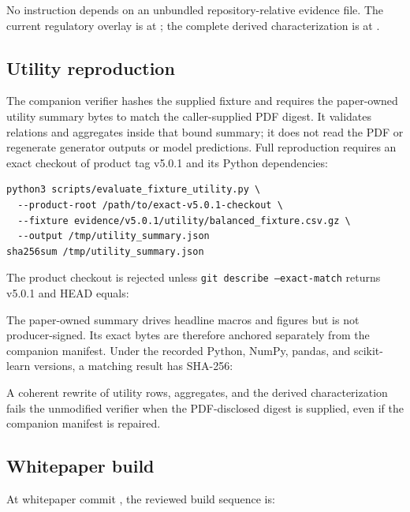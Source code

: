 No instruction depends on an unbundled repository-relative evidence file. The current regulatory
overlay is at
; the complete derived
characterization is at .

\subsection{Utility reproduction}

The companion verifier hashes the supplied fixture and requires the paper-owned utility summary
bytes to match the caller-supplied PDF digest. It validates relations and aggregates inside that
bound summary; it does not read the PDF or regenerate generator outputs or model predictions. Full
reproduction requires an exact checkout of product tag v5.0.1 and its Python dependencies:

\begin{verbatim}
python3 scripts/evaluate_fixture_utility.py \
  --product-root /path/to/exact-v5.0.1-checkout \
  --fixture evidence/v5.0.1/utility/balanced_fixture.csv.gz \
  --output /tmp/utility_summary.json
sha256sum /tmp/utility_summary.json
\end{verbatim}

The product checkout is rejected unless \texttt{git describe --exact-match} returns v5.0.1 and
HEAD equals:
\begin{center}
  \IdentityText{\ProductCommitRaw}
\end{center}
The paper-owned summary drives headline macros and figures but is not producer-signed. Its exact
bytes are therefore anchored separately from the companion manifest. Under the recorded Python,
NumPy, pandas, and scikit-learn versions, a matching result has SHA-256:
\begin{center}
  \IdentityText{\UtilitySummaryShaRaw}
\end{center}
A coherent rewrite of utility rows, aggregates, and the derived characterization fails the
unmodified verifier when the PDF-disclosed digest is supplied, even if the companion manifest is
repaired.

\subsection{Whitepaper build}

At whitepaper commit \IdentityText{\WhitepaperCommitRaw}, the reviewed build sequence is:


